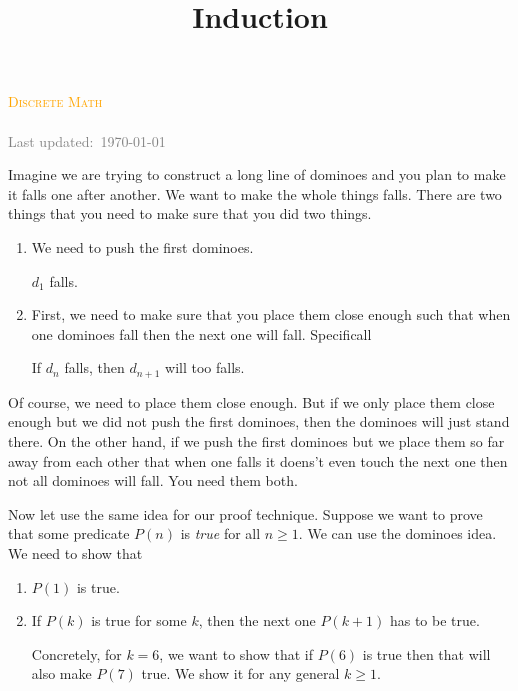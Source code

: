 \documentclass[a4paper, 12pt]{article}
\title{Induction}
\theoremstyle{examplestyle}
\newcommand{\course}{Discrete Math}
\begin{document}
\begin{center}
	\textcolor{orange}{\textsc{\course}}\\
	\huge\textbf{\textsc{\thetitle}}\\
	\small\textcolor{gray}{Last updated:\, \today \, \currenttime}\\
\end{center}

\begin{multicols}{2}
	Imagine we are trying to construct a long line of dominoes and you plan to make it falls one after another. We want to make the whole things falls. There are two things that you need to make sure that you did two things.
	\begin{enumerate}		
			\item We need to push the first dominoes. 
			\begin{center}
				$d_1$ falls.
			\end{center}
		\item First, we need to make sure that you place them close enough such that when one dominoes fall then the next one will fall. Specificall
		\begin{center}
			If $d_n$ falls, then $d_{n+1}$ will too falls.
		\end{center}

	\end{enumerate}
	
	Of course, we need to place them close enough. But if we only place them close enough but we did not push the first dominoes, then the dominoes will just stand there. On the other hand, if we push the first dominoes but we place them so far away from each other that when one falls it doens't even touch the next one then not all dominoes will fall. You need them both.
	
	Now let use the same idea for our proof technique. Suppose we want to prove that some predicate $P(n)$ is \emph{true} for all $n \ge 1$. We can use the dominoes idea. We need to show that
	\begin{enumerate}
		\item $P(1)$ is true.
		\item If $P(k)$ is true for some $k$, then the next one $P(k+1)$ has to be true.
		
		Concretely, for $k=6$, we want to show that if $P(6)$ is true then that will also make $P(7)$ true. We show it for any general $k\ge 1$.
	\end{enumerate} 
	

\end{multicols}
\end{document}
